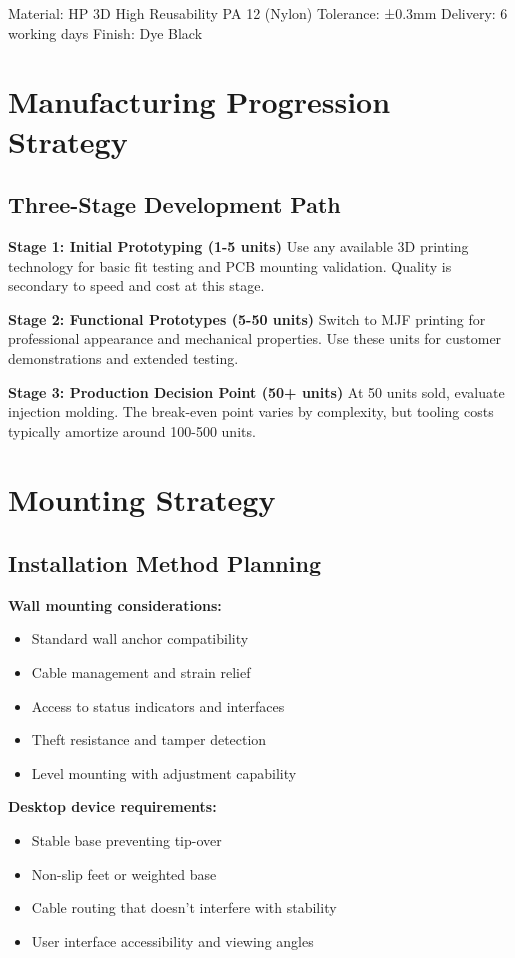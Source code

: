Material: HP 3D High Reusability PA 12 (Nylon)
Tolerance: ±0.3mm
Delivery: 6 working days
Finish: Dye Black

\section{Manufacturing Progression Strategy}

\subsection{Three-Stage Development Path}

\textbf{Stage 1: Initial Prototyping (1-5 units)}
Use any available 3D printing technology for basic fit testing and PCB mounting validation. Quality is secondary to speed and cost at this stage.

\textbf{Stage 2: Functional Prototypes (5-50 units)}
Switch to MJF printing for professional appearance and mechanical properties. Use these units for customer demonstrations and extended testing.

\textbf{Stage 3: Production Decision Point (50+ units)}
At 50 units sold, evaluate injection molding. The break-even point varies by complexity, but tooling costs typically amortize around 100-500 units.

\section{Mounting Strategy}

\subsection{Installation Method Planning}

\textbf{Wall mounting considerations:}
\begin{itemize}
\item Standard wall anchor compatibility
\item Cable management and strain relief
\item Access to status indicators and interfaces
\item Theft resistance and tamper detection
\item Level mounting with adjustment capability
\end{itemize}

\textbf{Desktop device requirements:}
\begin{itemize}
\item Stable base preventing tip-over
\item Non-slip feet or weighted base
\item Cable routing that doesn't interfere with stability
\item User interface accessibility and viewing angles
\end{itemize}

